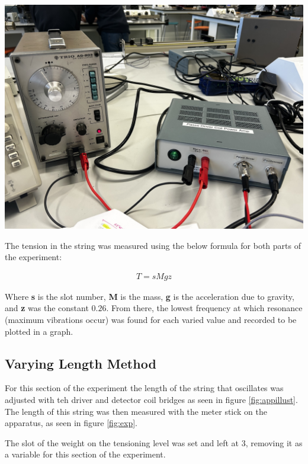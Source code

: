 \documentclass[12pt]{article}
\begin{document}
\begin{minipage}{.31\textwidth}
    \captionsetup{hypcap=false}
    \includegraphics[width=\linewidth]{wave exp 3.jpeg}
    \label{fig:box}
\end{minipage}

The tension in the string was measured using the below formula for both parts of the experiment:

\vspace{-1.5ex}
\begin{gather}
    T = sMgz
\end{gather}

Where \textbf{s} is the slot number, \textbf{M} is the mass, \textbf{g} is the acceleration due to gravity, and \textbf{z} was the constant $0.26$.
From there, the lowest frequency at which resonance (maximum vibrations occur) was found for each varied value and recorded to be plotted in a graph.

\subsection{Varying Length Method}

For this section of the experiment the length of the string that oscillates was adjusted with teh driver and detector coil bridges as seen in figure \ref{fig:appillust}.
The length of this string was then measured with the meter stick on the apparatus, as seen in figure \ref{fig:exp}.

The slot of the weight on the tensioning level was set and left at 3, removing it as a variable for this section of the experiment.
\end{document}
